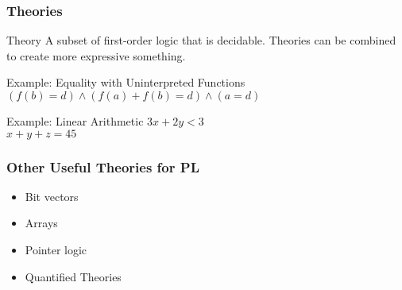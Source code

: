 \documentclass{beamer}
\theoremstyle{definition} %
\begin{document}
\begin{frame}
    \frametitle{Theories}

    \begin{block}{Theory}
        A subset of first-order logic that is decidable. Theories can be combined to create more expressive something. %
    \end{block}

    \begin{exampleblock}{Example: Equality with Uninterpreted Functions}
        $(f(b) = d) \wedge (f(a) + f(b) = d) \wedge (a = d)$
    \end{exampleblock}

    \pause

    \begin{exampleblock}{Example: Linear Arithmetic}
        $3x + 2y < 3$\\
        $x + y + z = 45$
    \end{exampleblock}
\end{frame}

\begin{frame}
    \frametitle{Other Useful Theories for PL}

    \begin{itemize}
        \item Bit vectors
        \item Arrays
        \item Pointer logic
        \item Quantified Theories
    \end{itemize}
\end{frame}
\end{document}

